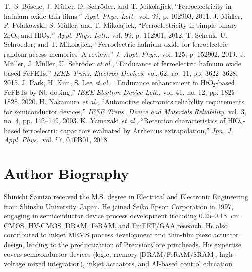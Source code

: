 \documentclass[conference]{IEEEtran}
\begin{document}
\begin{thebibliography}{8}\footnotesize
\setlength{\itemsep}{0.2ex}
\setlength{\parskip}{0pt}
 T.~S. B\"oscke, J. M\"uller, D. Schr\"oder, and T. Mikolajick, ``Ferroelectricity in hafnium oxide thin films,'' \emph{Appl. Phys. Lett.}, vol. 99, p. 102903, 2011.
 J. M\"uller, P. Polakowski, S. M\"uller, and T. Mikolajick, ``Ferroelectricity in simple binary ZrO$_2$ and HfO$_2$,'' \emph{Appl. Phys. Lett.}, vol. 99, p. 112901, 2012.
 T. Schenk, U. Schroeder, and T. Mikolajick, ``Ferroelectric hafnium oxide for ferroelectric random-access memories: A review,'' \emph{J. Appl. Phys.}, vol. 125, p. 152902, 2019.
 J. M\"uller, J. M\"uller, U. Schr\"oder \emph{et al.}, ``Endurance of ferroelectric hafnium oxide based FeFETs,'' \emph{IEEE Trans. Electron Devices}, vol. 62, no. 11, pp. 3622--3628, 2015.
 J. Park, H. Kim, S. Lee \emph{et al.}, ``Endurance enhancement in HfO$_2$-based FeFETs by Nb doping,'' \emph{IEEE Electron Device Lett.}, vol. 41, no. 12, pp. 1825--1828, 2020.
 H. Nakamura \emph{et al.}, ``Automotive electronics reliability requirements for semiconductor devices,'' \emph{IEEE Trans. Device and Materials Reliability}, vol. 3, no. 4, pp. 142--149, 2003.
 K. Yamazaki \emph{et al.}, ``Retention characteristics of HfO$_2$-based ferroelectric capacitors evaluated by Arrhenius extrapolation,'' \emph{Jpn. J. Appl. Phys.}, vol. 57, 04FB01, 2018.
\end{thebibliography}

\section*{Author Biography}
\small
Shinichi Samizo received the M.S. degree in Electrical and Electronic Engineering from Shinshu University, Japan. He joined Seiko Epson Corporation in 1997, engaging in semiconductor device process development including 0.25--0.18~$\mu$m CMOS, HV-CMOS, DRAM, FeRAM, and FinFET/GAA research. He also contributed to inkjet MEMS process development and thin-film piezo actuator design, leading to the productization of PrecisionCore printheads. His expertise covers semiconductor devices (logic, memory [DRAM/FeRAM/SRAM], high-voltage mixed integration), inkjet actuators, and AI-based control education.

\clearpage
\end{document}
